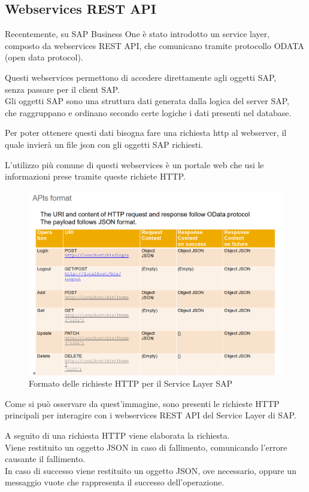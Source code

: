 \subsection{Webservices REST API}
\begin{flushleft}
	\item Recentemente, su SAP Business One è stato introdotto un service layer, composto da webservices REST API, che comunicano tramite protocollo ODATA (open data protocol).
	\item Questi webservices permettono di accedere direttamente agli oggetti SAP,\\senza passare per il client SAP.\\Gli oggetti SAP sono una struttura dati generata dalla logica del server SAP, \\che raggruppano e ordinano secondo certe logiche i dati presenti nel database.
	\item Per poter ottenere questi dati bisogna fare una richiesta http al webserver, il quale invierà un file json con gli oggetti SAP richiesti.
	\item L'utilizzo più comune di questi webservices è un portale web che usi le informazioni prese tramite queste richiete HTTP. 
\end{flushleft}
\begin{figure}[!h] 
	\centering 
	\includegraphics[scale = 0.4]{immagini/api_Format.png} 
	\caption {Formato delle richieste HTTP per il Service Layer SAP}
\end{figure}
\begin{flushleft}
	\item Come si può osservare da quest'immagine, sono presenti le richieste HTTP principali per interagire con i webservices REST API del Service Layer di SAP.
	\item A seguito di una richiesta HTTP viene elaborata la richiesta.\\Viene restituito un oggetto JSON in caso di fallimento, comunicando l'errore causante il fallimento.\\In caso di successo viene restituito un oggetto JSON, ove necessario, oppure un messaggio vuote che rappresenta il successo dell'operazione.
\end{flushleft}



